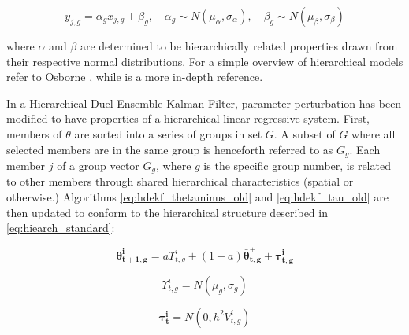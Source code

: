 \begin{equation}\label{eq:hiearch_standard}
y_{j,g} = \alpha_{g} x_{j,g} + \beta_{g}, \quad \alpha_{g} \sim N( \mu_{\alpha}, \sigma_{\alpha} ), \quad \beta_{g} \sim N( \mu_{\beta} , \sigma_{\beta} )
\end{equation}

where $\alpha$ and $\beta$ are determined to be hierarchically related properties drawn from their respective normal distributions. For a simple overview of hierarchical models refer to Osborne \cite{Osborne2000}, while \cite{Gelman2013} is a more in-depth reference.

In a Hierarchical Duel Ensemble Kalman Filter, parameter perturbation has been modified to have properties of a hierarchical linear regressive system. First, members of $\theta$ are sorted into a series of groups in set $G$. A subset of $G$ where all selected members are in the same group is henceforth referred to as $G_g$. Each member $j$ of a group vector $G_g$, where $g$ is the specific group number, is related to other members through shared hierarchical characteristics (spatial or otherwise.) Algorithms \eqref{eq:hdekf_thetaminus_old} and \eqref{eq:hdekf_tau_old} are then updated to conform to the hierarchical structure described in \eqref{eq:hiearch_standard}:

\begin{equation}\label{eq:hdekf_theta}
\mathbf{\theta_{t+1,g}^{i-}} = a \Upsilon_{t,g}^{i} + (1-a)\mathbf{\bar{\theta}_{t,g}^{+}} + \mathbf{\tau_{t,g}^{i}}
\end{equation}


\begin{equation}\label{eq:hdekf_tau}
\Upsilon_{t,g}^{i} = N( \mu_{g}, \sigma_{g} )
\end{equation}

\begin{equation}\label{eq:hdekf_tau}
\mathbf{\tau_{t}^{i}} = N(0, h^{2}V_{t,g}^{i})
\end{equation}


